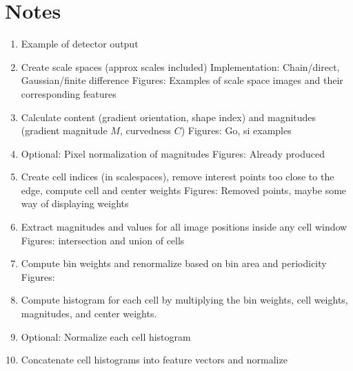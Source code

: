 \documentclass[thesis.tex]{subfiles}
\begin{document}
\section{Notes}
%
%
\begin{enumerate}
\item Example of detector output
\item Create scale spaces (approx scales included)
	Implementation: Chain/direct, Gaussian/finite difference
	Figures: Examples of scale space images and their corresponding features
\item Calculate content (gradient orientation, shape index) and magnitudes (gradient magnitude $M$, curvedness $C$)
	Figures: Go, si examples
\item Optional: Pixel normalization of magnitudes
	Figures: Already produced
\item Create cell indices (in scalespaces), remove interest points too close to the edge, compute cell and center weights
	Figures: Removed points, maybe some way of displaying weights
\item Extract magnitudes and values for all image positions inside any cell window
	Figures: intersection and union of cells
\item Compute bin weights and renormalize based on bin area and periodicity
	Figures: 
\item Compute histogram for each cell by multiplying the bin weights, cell weights, magnitudes, and center weights.
\item Optional: Normalize each cell histogram
\item Concatenate cell histograms into feature vectors and normalize
\end{enumerate}
%
\subbibliography
\end{document}
